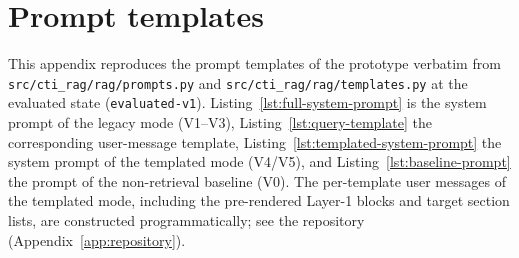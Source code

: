 \chapter{Prompt templates}
\label{app:prompts}

This appendix reproduces the prompt templates of the prototype verbatim
from \texttt{src/cti\_rag/rag/prompts.py} and
\texttt{src/cti\_rag/rag/templates.py} at the evaluated state
(\texttt{evaluated-v1}). Listing~\ref{lst:full-system-prompt} is the
system prompt of the legacy mode (V1--V3),
Listing~\ref{lst:query-template} the corresponding user-message template,
Listing~\ref{lst:templated-system-prompt} the system prompt of the
templated mode (V4/V5), and Listing~\ref{lst:baseline-prompt} the prompt
of the non-retrieval baseline (V0). The per-template user messages of the
templated mode, including the pre-rendered Layer-1 blocks and target
section lists, are constructed programmatically; see the repository
(Appendix~\ref{app:repository}).


